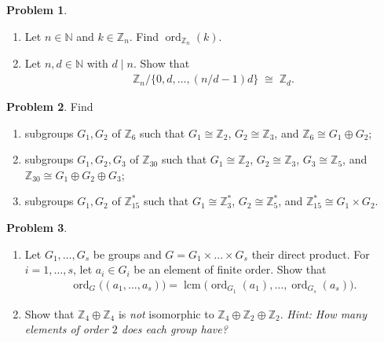 \documentclass[10pt]{article}
\theoremstyle{definition} %
\newtheorem{problem}{Problem}
\theoremstyle{plain} %
\begin{document}
\begin{problem}
    \begin{enumerate}[label=(\alph*)]
        \item Let $n \in \mathbb{N}$ and $k \in \mathbb{Z}_n$.  Find $\operatorname{ord}_{\mathbb{Z}_n}(k)$.
        \item Let $n, d \in \mathbb{N}$ with $d \mid n$.  Show that
            \begin{align*}
                \mathbb{Z}_n / \{0, d, \dots, (n/d - 1)d\} \;\cong\; \mathbb{Z}_d.
            \end{align*}
    \end{enumerate}
\end{problem}

\begin{problem}
    Find
    \begin{enumerate}[label=(\alph*)]
        \item subgroups $G_1, G_2$ of $\mathbb{Z}_6$ such that $G_1 \cong \mathbb{Z}_2$, $G_2 \cong \mathbb{Z}_3$, and $\mathbb{Z}_6 \cong G_1 \oplus G_2$;
        \item subgroups $G_1, G_2, G_3$ of $\mathbb{Z}_{30}$ such that $G_1 \cong \mathbb{Z}_2$, $G_2 \cong \mathbb{Z}_3$, $G_3 \cong \mathbb{Z}_5$, and $\mathbb{Z}_{30} \cong G_1 \oplus G_2 \oplus G_3$;
        \item subgroups $G_1, G_2$ of $\mathbb{Z}_{15}^{*}$ such that $G_1 \cong \mathbb{Z}_3^{*}$, $G_2 \cong \mathbb{Z}_5^{*}$, and $\mathbb{Z}_{15}^{*} \cong G_1 \times G_2$.
    \end{enumerate}
\end{problem}

\begin{problem}
    \begin{enumerate}[label=(\alph*)]
        \item Let $G_1, \dots, G_s$ be groups and $G = G_1 \times \dots \times G_s$ their direct product.  
              For $i = 1, \dots, s$, let $a_i \in G_i$ be an element of finite order.  Show that
              \begin{align*}
                  \operatorname{ord}_G\bigl((a_1, \dots, a_s)\bigr)
                  = \operatorname{lcm}\bigl(\operatorname{ord}_{G_1}(a_1), \dots, \operatorname{ord}_{G_s}(a_s)\bigr).
              \end{align*}
        \item Show that $\mathbb{Z}_4 \oplus \mathbb{Z}_4$ is \emph{not} isomorphic to
              $\mathbb{Z}_4 \oplus \mathbb{Z}_2 \oplus \mathbb{Z}_2$.  
              \textit{Hint: How many elements of order $2$ does each group have?}
    \end{enumerate}
\end{problem}
\end{document}
